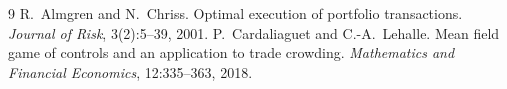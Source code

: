 \documentclass[11pt]{article}
\theoremstyle{definition}
\theoremstyle{remark}
\begin{document}
\begin{thebibliography}{9}
 R.~Almgren and N.~Chriss. Optimal execution of portfolio transactions.
\emph{Journal of Risk}, 3(2):5--39, 2001.
 P.~Cardaliaguet and C.-A.~Lehalle. Mean field game of controls and an
application to trade crowding. \emph{Mathematics and Financial Economics}, 12:335--363, 2018.
\end{thebibliography}
\end{document}
